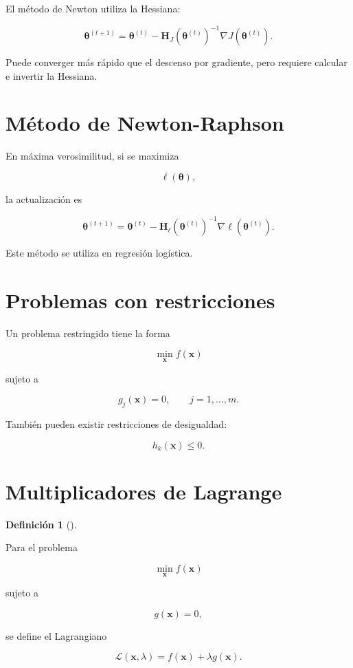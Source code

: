 \documentclass[
  spanish,
  11pt,
  letterpaper,
  DIV=11,
  numbers=noendperiod]{scrreprt}
\theoremstyle{definition}
\newtheorem{definition}{Definición}[chapter]
\theoremstyle{plain}
\theoremstyle{definition}
\theoremstyle{remark}
\begin{document}
El método de Newton utiliza la Hessiana:

\[
\boldsymbol{\theta}^{(t+1)}
=
\boldsymbol{\theta}^{(t)}
-
\mathbf{H}_J(
\boldsymbol{\theta}^{(t)}
)^{-1}
\nabla J(
\boldsymbol{\theta}^{(t)}
).
\]

Puede converger más rápido que el descenso por gradiente, pero requiere
calcular e invertir la Hessiana.

\section{Método de Newton-Raphson}\label{muxe9todo-de-newton-raphson}

En máxima verosimilitud, si se maximiza

\[
\ell(\boldsymbol{\theta}),
\]

la actualización es

\[
\boldsymbol{\theta}^{(t+1)}
=
\boldsymbol{\theta}^{(t)}
-
\mathbf{H}_{\ell}(
\boldsymbol{\theta}^{(t)}
)^{-1}
\nabla\ell(
\boldsymbol{\theta}^{(t)}
).
\]

Este método se utiliza en regresión logística.

\section{Problemas con restricciones}\label{problemas-con-restricciones}

Un problema restringido tiene la forma

\[
\min_{\mathbf{x}}
f(\mathbf{x})
\]

sujeto a

\[
g_j(\mathbf{x})=0,
\qquad
j=1,\ldots,m.
\]

También pueden existir restricciones de desigualdad:

\[
h_k(\mathbf{x})\leq 0.
\]

\section{Multiplicadores de Lagrange}\label{multiplicadores-de-lagrange}

\begin{definition}[]\protect\hypertarget{def-lagrangiano}{}\label{def-lagrangiano}

Para el problema

\[
\min_{\mathbf{x}}
f(\mathbf{x})
\]

sujeto a

\[
g(\mathbf{x})=0,
\]

se define el Lagrangiano

\[
\mathcal{L}(
\mathbf{x},\lambda
)
=
f(\mathbf{x})
+
\lambda g(\mathbf{x}).
\]

\end{definition}
\end{document}
